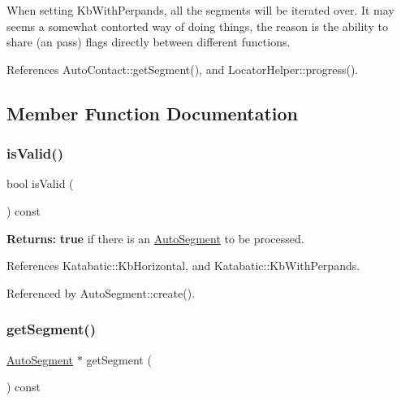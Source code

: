 When setting Kb\+With\+Perpands, all the segments will be iterated over. It may seems a somewhat contorted way of doing things, the reason is the ability to share (an pass) flags directly between different functions. 

References Auto\+Contact\+::get\+Segment(), and Locator\+Helper\+::progress().



\subsection{Member Function Documentation}
\mbox{\label{classKatabatic_1_1LocatorHelper_a5bc2a781be2586924afce4e4a4ea6697}} 
\subsubsection{\texorpdfstring{is\+Valid()}{isValid()}}
{\footnotesize\ttfamily bool is\+Valid (\begin{DoxyParamCaption}{ }\end{DoxyParamCaption}) const\hspace{0.3cm}{\ttfamily [inline]}}

{\bfseries Returns\+:} {\bfseries true} if there is an \hyperlink{classKatabatic_1_1AutoSegment}{Auto\+Segment} to be processed. 

References Katabatic\+::\+Kb\+Horizontal, and Katabatic\+::\+Kb\+With\+Perpands.



Referenced by Auto\+Segment\+::create().

\mbox{\label{classKatabatic_1_1LocatorHelper_ad0f8becc4187c833b6f6c5f902f8aaa5}} 
\subsubsection{\texorpdfstring{get\+Segment()}{getSegment()}}
{\footnotesize\ttfamily \hyperlink{classKatabatic_1_1AutoSegment}{Auto\+Segment} $\ast$ get\+Segment (\begin{DoxyParamCaption}{ }\end{DoxyParamCaption}) const\hspace{0.3cm}{\ttfamily [inline]}}

